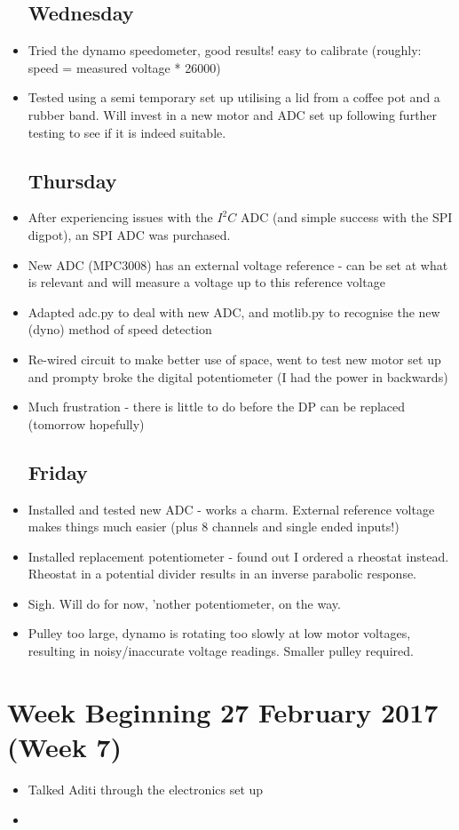 \documentclass[a4]{report}
\def\mon{\subsection*{Monday}}
\def\thu{\subsection*{Thursday}}
\def\fri{\subsection*{Friday}}
\begin{document}
\begin{itemize}
		\subsection*{Wednesday}
		\item Tried the dynamo speedometer, good results! easy to calibrate (roughly: speed = measured voltage * 26000)
		\item Tested using a semi temporary set up utilising a lid from a coffee pot and a rubber band. Will invest in a new motor and ADC set up following further testing to see if it is indeed suitable.
		\thu
		\item After experiencing issues with the \(I^2C\) ADC (and simple success with the SPI digpot), an SPI ADC was purchased.
		\item New ADC (MPC3008) has an external voltage reference - can be set at what is relevant and will measure a voltage up to this reference voltage
		\item Adapted adc.py to deal with new ADC, and motlib.py to recognise the new (dyno) method of speed detection
		\item Re-wired circuit to make better use of space, went to test new motor set up and prompty broke the digital potentiometer (I had the power in backwards)
		\item Much frustration - there is little to do before the DP can be replaced (tomorrow hopefully)
		\fri
		\item Installed and tested new ADC - works a charm. External reference voltage makes things much easier (plus 8 channels and single ended inputs!)
		\item Installed replacement potentiometer - found out I ordered a rheostat instead. Rheostat in a potential divider results in an inverse parabolic response.
		\item Sigh. Will do for now, 'nother potentiometer, on the way.
		\item Pulley too large, dynamo is rotating too slowly at low motor voltages, resulting in noisy/inaccurate voltage readings. Smaller pulley required.
	\end{itemize}
	\newpage
	\section{Week Beginning 27 February 2017 (Week 7)}
	\begin{itemize}
		\mon
		\item Talked Aditi through the electronics set up
		\item 
		

	\end{itemize}
	\newpage
\end{document}
